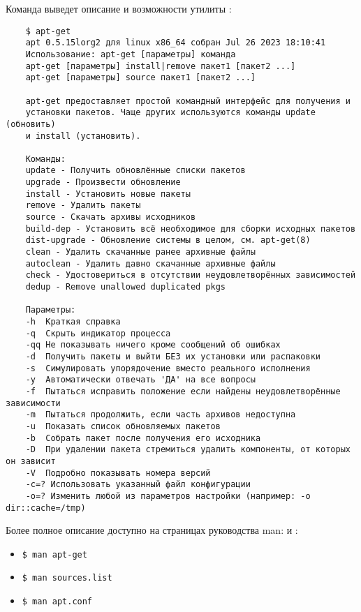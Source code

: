 Команда  выведет описание и возможности утилиты :
\begin{verbatim}
	$ apt-get
	apt 0.5.15lorg2 для linux x86_64 собран Jul 26 2023 18:10:41
	Использование: apt-get [параметры] команда
	apt-get [параметры] install|remove пакет1 [пакет2 ...]
	apt-get [параметры] source пакет1 [пакет2 ...]
	
	apt-get предоставляет простой командный интерфейс для получения и
	установки пакетов. Чаще других используются команды update (обновить)
	и install (установить).
	
	Команды:
	update - Получить обновлённые списки пакетов
	upgrade - Произвести обновление
	install - Установить новые пакеты
	remove - Удалить пакеты
	source - Скачать архивы исходников
	build-dep - Установить всё необходимое для сборки исходных пакетов
	dist-upgrade - Обновление системы в целом, см. apt-get(8)
	clean - Удалить скачанные ранее архивные файлы
	autoclean - Удалить давно скачанные архивные файлы
	check - Удостовериться в отсутствии неудовлетворённых зависимостей
	dedup - Remove unallowed duplicated pkgs
	
	Параметры:
	-h  Краткая справка
	-q  Скрыть индикатор процесса
	-qq Не показывать ничего кроме сообщений об ошибках
	-d  Получить пакеты и выйти БЕЗ их установки или распаковки
	-s  Симулировать упорядочение вместо реального исполнения
	-y  Автоматически отвечать 'ДА' на все вопросы
	-f  Пытаться исправить положение если найдены неудовлетворённые зависимости
	-m  Пытаться продолжить, если часть архивов недоступна
	-u  Показать список обновляемых пакетов
	-b  Собрать пакет после получения его исходника
	-D  При удалении пакета стремиться удалить компоненты, от которых он зависит
	-V  Подробно показывать номера версий
	-c=? Использовать указанный файл конфигурации
	-o=? Изменить любой из параметров настройки (например: -o dir::cache=/tmp)
\end{verbatim}

Более полное описание доступно на страницах руководства man:
 и :
\begin{itemize}
	\item\begin{verbatim}$ man apt-get\end{verbatim}
	\item\begin{verbatim}$ man sources.list\end{verbatim}
	\item\begin{verbatim}$ man apt.conf\end{verbatim}
\end{itemize}

